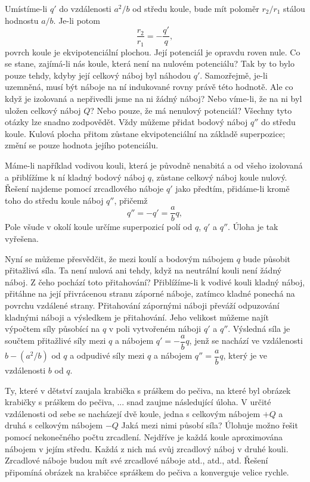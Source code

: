     Umístíme-li \(q'\) do vzdálenosti \(a^2/b\) od středu koule, bude mít poloměr \(r_2/r_1\) 
    stálou hodnostu \(a/b\). Je-li potom
    \begin{equation}\label{fyz:eq290}
      \dfrac{r_2}{r_1} = -\dfrac{q'}{q},
    \end{equation}
    povrch koule je ekvipotenciální plochou. Její potenciál je opravdu roven nule. Co se stane, 
    zajímá-li nás koule, která není na nulovém potenciálu? Tak by to bylo pouze tehdy, kdyby její 
    celkový náboj byl náhodou \(q'\). Samozřejmě, je-li uzemněná, musí být náboje na ní indukované 
    rovny právě této hodnotě. Ale co když je izolovaná a nepřivedli jsme na ni žádný náboj? Nebo 
    víme-li, že na ni byl uložen celkový náboj \(Q\)? Nebo pouze, že má nenulový potenciál? Všechny 
    tyto otázky lze snadno zodpovědět. Vždy můžeme přidat bodový náboj \(q''\) do středu koule. 
    Kulová plocha přitom zůstane ekvipotenciální na základě superpozice; změní se pouze hodnota 
    jejího potenciálu. 
    
    Máme-li například vodivou kouli, která je původně nenabitá a od všeho izolovaná a přiblížíme k 
    ní kladný bodový náboj \(q\), zůstane celkový náboj koule nulový. Řešení najdeme 
    pomocí zrcadlového náboje \(q'\) jako předtím, přidáme-li kromě toho do středu koule náboj 
    \(q''\), přičemž
    \begin{equation}\label{fyz:eq291}
      q'' = -q' = \dfrac{a}{b}q,
    \end{equation}
    Pole všude v okolí koule určíme superpozicí polí od \(q\), \(q'\) a \(q''\). Úloha je tak 
    vyřešena.
    
    Nyní se můžeme přesvědčit, že mezi koulí a bodovým nábojem \(q\) bude působit přitažlivá síla. 
    Ta není nulová ani tehdy, když na neutrální kouli není žádný náboj. Z čeho pochází toto 
    přitahování? Přiblížíme-li k vodivé kouli kladný náboj, přitáhne na její přivrácenou stranu 
    záporné náboje, zatímco kladné ponechá na povrchu vzdálené strany. Přitahování zápornými náboji 
    převáží odpuzování kladnými náboji a výsledkem je přitahování. Jeho velikost můžeme najít 
    výpočtem síly působící na \(q\) v poli vytvořeném náboji \(q'\) a \(q''\). Výsledná síla je 
    součtem přitažlivé síly mezi \(q\) a nábojem \(q' = -\dfrac{a}{b}q\), jenž se nachází ve 
    vzdálenosti \(b - (a^2/b)\) od \(q\) a odpudivé síly mezi \(q\) a nábojem \(q'' = 
    \dfrac{a}{b}q\), který je ve vzdálenosti \(b\) od \(q\). 
    
    Ty, které v dětství zaujala krabička s práškem do pečiva, na které byl obrázek krabičky s 
    práškem do pečiva, ... snad zaujme následující úloha. V určité vzdálenosti od sebe se 
    nacházejí dvě koule, jedna s celkovým nábojem \(+Q\) a druhá s celkovým nábojem  \(-Q\) Jaká 
    mezi nimi působí síla? Úlohuje možno řešit pomocí nekonečného počtu zrcadlení. Nejdříve je 
    každá koule aproximována nábojem v jejím středu. Každá z nich má svůj zrcadlový náboj v druhé 
    kouli. Zrcadlové náboje budou mít své zrcadlové náboje atd., atd., atd. Řešení připomíná 
    obrázek na krabičce spráškem do pečiva a konverguje velice rychle.

